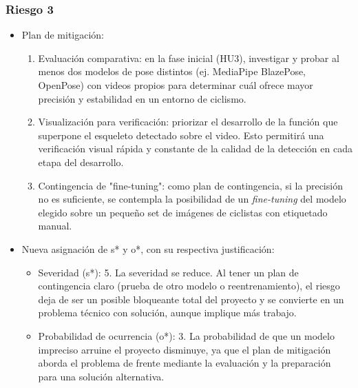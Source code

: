 \documentclass[
11pt, %
]{charter}
\begin{document}
\subsubsection*{Riesgo 3}
\begin{itemize}
    \item Plan de mitigación:
    \begin{enumerate}
        \item Evaluación comparativa: en la fase inicial (HU3), investigar y probar al menos dos modelos de pose distintos (ej. MediaPipe BlazePose, OpenPose) con videos propios para determinar cuál ofrece mayor precisión y estabilidad en un entorno de ciclismo.
        \item Visualización para verificación: priorizar el desarrollo de la función que superpone el esqueleto detectado sobre el video. Esto permitirá una verificación visual rápida y constante de la calidad de la detección en cada etapa del desarrollo.
        \item Contingencia de "fine-tuning": como plan de contingencia, si la precisión no es suficiente, se contempla la posibilidad de un \textit{fine-tuning} del modelo elegido sobre un pequeño set de imágenes de ciclistas con etiquetado manual.
    \end{enumerate}
    \item Nueva asignación de s* y o*, con su respectiva justificación:
    \begin{itemize}
        \item Severidad (s*): 5. La severidad se reduce. Al tener un plan de contingencia claro (prueba de otro modelo o reentrenamiento), el riesgo deja de ser un posible bloqueante total del proyecto y se convierte en un problema técnico con solución, aunque implique más trabajo.
        \item Probabilidad de ocurrencia (o*): 3. La probabilidad de que un modelo impreciso arruine el proyecto disminuye, ya que el plan de mitigación aborda el problema de frente mediante la evaluación y la preparación para una solución alternativa.
    \end{itemize}
\end{itemize}
\end{document}
